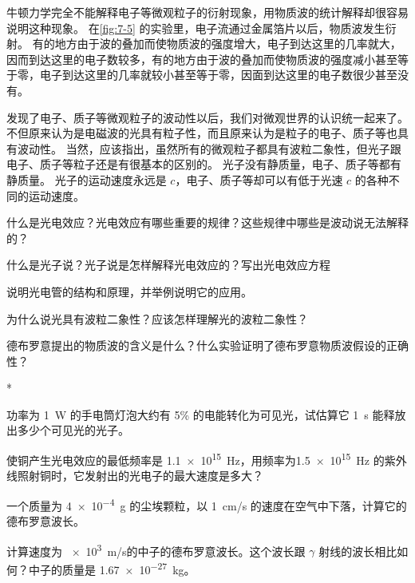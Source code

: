 牛顿力学完全不能解释电子等微观粒子的衍射现象，用物质波的统计解释却很容易说明这种现象。
在\cref{fig:7-5} 的实验里，电子流通过金属箔片以后，物质波发生衍射。
有的地方由于波的叠加而使物质波的强度增大，电子到达这里的几率就大，因而到达这里的电子数较多，有的地方由于波的叠加而使物质波的强度减小甚至等于零，电子到达这里的几率就较小甚至等于零，因面到达这里的电子数很少甚至没有。

发现了电子、质子等微观粒子的波动性以后，我们对微观世界的认识统一起来了。
不但原来认为是电磁波的光具有粒子性，而且原来认为是粒子的电子、质子等也具有波动性。
当然，应该指出，虽然所有的微观粒子都具有波粒二象性，但光子跟电子、质子等粒子还是有很基本的区别的。
光子没有静质量，电子、质子等都有静质量。
光子的运动速度永远是 $c$，电子、质子等却可以有低于光速 $c$ 的各种不同的运动速度。

\begin{Review}
\begin{question}
  \item 什么是光电效应？光电效应有哪些重要的规律？这些规律中哪些是波动说无法解释的？
  \item 什么是光子说？光子说是怎样解释光电效应的？写出光电效应方程
  \item 说明光电管的结构和原理，并举例说明它的应用。
  \item 为什么说光具有波粒二象性？应该怎样理解光的波粒二象性？
  \item 德布罗意提出的物质波的含义是什么？什么实验证明了德布罗意物质波假设的正确性？
\end{question}
\end{Review}

\begin{Exercise}*
\begin{question}
  \item 功率为 \qty{1}{W} 的手电筒灯泡大约有 5\% 的电能转化为可见光，试估算它 \qty{1}{s} 能释放出多少个可见光的光子。
  \item 使铜产生光电效应的最低频率是 \qty{1.1e15}{Hz}，用频率为\qty{1.5e15}{Hz} 的紫外线照射铜时，它发射出的光电子的最大速度是多大？
  \item 一个质量为 \qty{4e-4}{g} 的尘埃颗粒，以 \qty{1}{cm/s} 的速度在空气中下落，计算它的德布罗意波长。
  \item 计算速度为 \qty{e3}{m/s}的中子的德布罗意波长。这个波长跟 $\gamma$ 射线的波长相比如何？中子的质量是 \qty{1.67e-27}{kg}。
\end{question}
\end{Exercise}